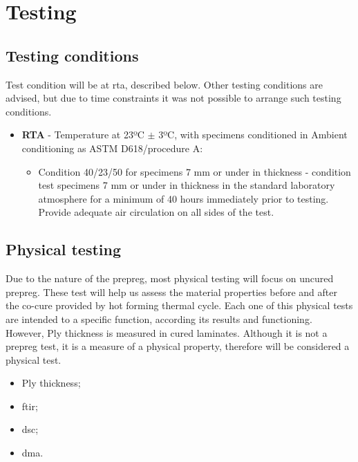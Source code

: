 \section{Testing}
\label{tests}

\subsection{Testing conditions}
\label{testingc}

Test condition will be at \gls{rta}, described below. Other testing conditions are advised, but due to time constraints it was not possible to arrange such testing conditions.

\begin{itemize}
\item \textbf{RTA} - Temperature at 23ºC $\pm$ 3ºC, with specimens conditioned in Ambient conditioning as ASTM D618/procedure A:
	\begin{itemize}
		\item Condition 40/23/50 for specimens 7 mm or under in thickness - condition test specimens 7 mm or under in thickness in the standard laboratory atmosphere for a minimum of 40 hours immediately prior to testing. Provide adequate air circulation on all sides of the test.
	\end{itemize}
\end{itemize}

\subsection{Physical testing}
\label{sec:physical}

Due to the nature of the prepreg, most physical testing will focus on uncured prepreg. These test will help us assess the material properties before and after the co-cure provided by hot forming thermal cycle. Each one of this physical tests are intended to a specific function, according its results and functioning. However, Ply thickness is measured in cured laminates. Although it is not a prepreg test, it is a measure of a physical property, therefore will be considered a physical test.

\begin{itemize}
	\item Ply thickness;
	\item \gls{ftir};
	\item \gls{dsc};
	\item \gls{dma}.
\end{itemize}

